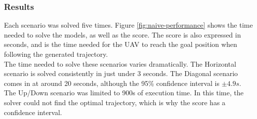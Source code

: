 \subsubsection{Results}
Each scenario was solved five times. Figure \ref{fig:naive-performance} shows the time needed to solve the models, as well as the score. The score is also expressed in seconds, and is the time needed for the UAV to reach the goal position when following the generated trajectory. \\
The time needed to solve these scenarios varies dramatically. The Horizontal scenario is solved consistently in just under 3 seconds. The Diagonal scenario comes in at around 20 seconds, although the 95\% confidence interval is $\pm 4.9s$. The Up/Down scenario was limited to 900s of execution time. In this time, the solver could not find the optimal trajectory, which is why the score has a confidence interval.
